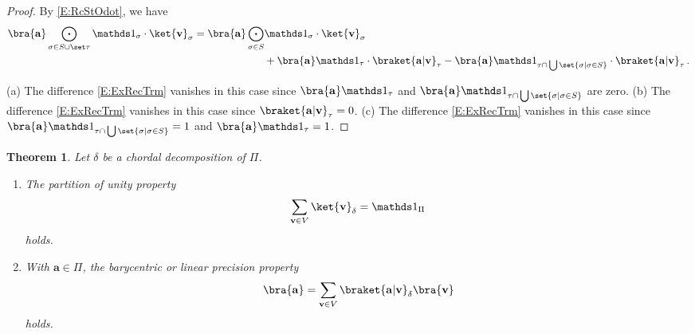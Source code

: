 \documentclass[12pt]{amsart}
\theoremstyle{plain}
\newtheorem{theorem}{Theorem}[section]
\theoremstyle{definition}
\numberwithin{equation}{section}
\begin{document}
\begin{proof}
By \eqref{E:RcStOdot}, we have
\begin{align}\notag
\bra{\mathbf a}\bigodot_{\sigma\in S\cup\set\tau}\mathds 1_\sigma\cdot\ket{\mathbf v}_\sigma
=
\bra{\mathbf a}\bigodot_{\sigma\in S}&\mathds 1_\sigma\cdot\ket{\mathbf v}_\sigma
\\ \label{E:ExRecTrm}
&
+\bra{\mathbf a}\mathds 1_\tau\cdot\braket{\mathbf a|\mathbf v}_\tau
-\bra{\mathbf a}\mathds 1_{\tau\cap\,\bigcup\set{\sigma|\sigma\in S}}\cdot
\braket{\mathbf a|\mathbf v}_\tau\,.
\end{align}

\vskip 2mm
\noindent
(a)
The difference \eqref{E:ExRecTrm} vanishes in this case since $\bra{\mathbf a}\mathds1_\tau$ and $\bra{\mathbf a}\mathds1_{\tau\cap\,\bigcup\set{\sigma|\sigma\in S}}$ are zero.
\vskip 2mm
\noindent
(b)
The difference \eqref{E:ExRecTrm} vanishes in this case since $\braket{\mathbf a|\mathbf v}_\tau=0$.
\vskip 2mm
\noindent
(c)
The difference \eqref{E:ExRecTrm} vanishes in this case since $\bra{\mathbf a}\mathds 1_{\tau\cap\,\bigcup\set{\sigma|\sigma\in S}}=1$ and $\bra{\mathbf a}\mathds 1_\tau=1$.
\end{proof}



\begin{theorem}\label{T:ChrdCord}
Let $\delta$ be a chordal decomposition of $\Pi$.
\begin{enumerate}
\item[$(\mathrm a)$]
The partition of unity property
$$
\sum_{\mathbf{v}\in V}\ket{\mathbf v}_\delta=\mathds 1_\Pi
$$
holds.
\item[$(\mathrm b)$]
With $\mathbf a\in\Pi$, the barycentric or linear precision property
\begin{equation}\label{E:LnPrChrd}
\bra{\mathbf a}=\sum_{\mathbf v\in V}\braket{\mathbf a|\mathbf v}_\delta\bra{\mathbf v}
\end{equation}
holds.
\end{enumerate}
\end{theorem}
\end{document}

